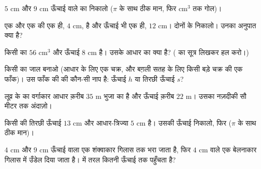 \begin{exercise}[$\star$]\label{exo:g8:solids:3}
$5$ cm  और $9$ cm ऊँचाई वाले  का  निकालो ($\pi$ के
साथ ठीक मान, फिर cm$^3$ तक गोल)।
\end{exercise}

\begin{exercise}[$\star$]\label{exo:g8:solids:4}
एक  और एक  की  एक ही, $4$ cm, है और ऊँचाई भी एक ही,
$12$ cm। दोनों के  निकालो। उनका अनुपात क्या है?
\end{exercise}

\begin{exercise}[$\star$]\label{exo:g8:solids:5}
किसी  का  $56$ cm$^3$ और ऊँचाई $8$ cm है। उसके आधार का
 क्या है? ( का सूत्र लिखकर हल करो।)
\end{exercise}

\begin{exercise}[$\star$]\label{exo:g8:solids:6}
किसी  का जाल बनाओ (आधार के लिए एक चक्र, और बग़ली सतह के लिए किसी
बड़े चक्र की एक फाँक)। उस फाँक की   की कौन-सी नाप है:
ऊँचाई $h$ या तिरछी ऊँचाई $s$?
\end{exercise}

\begin{exercise}[$\star\star$]\label{exo:g8:solids:7}
लूव्र के  का वर्गाकार आधार क़रीब $35$ m भुजा का है और ऊँचाई
क़रीब $22$ m। उसका  नज़दीकी सौ  मीटर तक अंदाज़ो।
\end{exercise}

\begin{exercise}[$\star\star$]\label{exo:g8:solids:8}
किसी  की तिरछी ऊँचाई $13$ cm और आधार-त्रिज्या $5$ cm है। उसकी
ऊँचाई निकालो, फिर  ($\pi$ के साथ ठीक मान)।
\end{exercise}

\begin{exercise}[$\star\star$]\label{exo:g8:solids:9}
$4$ cm  और $9$ cm ऊँचाई वाला एक शंक्वाकार गिलास  तक
भरा जाता है, फिर $4$ cm  वाले एक बेलनाकार गिलास में उँडेल
दिया जाता है।  में तरल कितनी ऊँचाई तक पहुँचता है?
\end{exercise}

